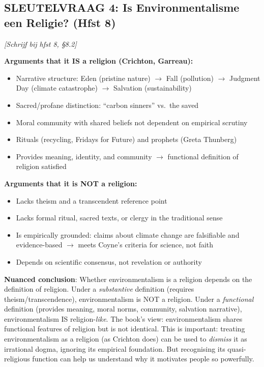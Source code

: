 \documentclass[a4paper,10pt]{article}
\begin{document}
\vspace{3pt}

\begin{answerbox}
\subsection{SLEUTELVRAAG 4: Is Environmentalisme een Religie? (Hfst 8)}

\textit{[Schrijf bij hfst 8, §8.2]}

\textbf{Arguments that it IS a religion (Crichton, Garreau):}
\begin{itemize}[noitemsep]
  \item Narrative structure: Eden (pristine nature) $\to$ Fall (pollution) $\to$ Judgment Day (climate catastrophe) $\to$ Salvation (sustainability)
  \item Sacred/profane distinction: ``carbon sinners'' vs.\ the saved
  \item Moral community with shared beliefs not dependent on empirical scrutiny
  \item Rituals (recycling, Fridays for Future) and prophets (Greta Thunberg)
  \item Provides meaning, identity, and community $\to$ functional definition of religion satisfied
\end{itemize}

\textbf{Arguments that it is NOT a religion:}
\begin{itemize}[noitemsep]
  \item Lacks theism and a transcendent reference point
  \item Lacks formal ritual, sacred texts, or clergy in the traditional sense
  \item Is empirically grounded: claims about climate change are falsifiable and evidence-based $\to$ meets Coyne's criteria for science, not faith
  \item Depends on scientific consensus, not revelation or authority
\end{itemize}

\textbf{Nuanced conclusion}: Whether environmentalism is a religion depends on the definition of religion. Under a \textit{substantive} definition (requires theism/transcendence), environmentalism is NOT a religion. Under a \textit{functional} definition (provides meaning, moral norms, community, salvation narrative), environmentalism IS religion-\textit{like}. The book's view: environmentalism shares functional features of religion but is not identical. This is important: treating environmentalism as a religion (as Crichton does) can be used to \textit{dismiss} it as irrational dogma, ignoring its empirical foundation. But recognising its quasi-religious function can help us understand why it motivates people so powerfully.
\end{answerbox}
\end{document}
